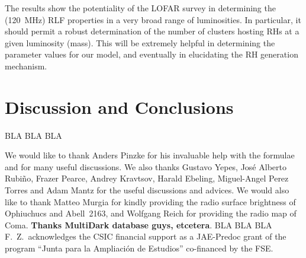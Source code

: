 \documentclass[traditabstract]{aa}
\begin{document}
The results show the potentiality of the LOFAR survey in determining the (120~MHz) RLF properties in a very broad range of luminosities. In particular, it should permit a robust determination of the number of clusters hosting RHs at a given luminosity (mass). This will be extremely helpful in determining the parameter values for our model, and eventually in elucidating the RH generation mechanism.


\section{Discussion and Conclusions}
\label{sec:6}
BLA BLA BLA\\


\begin{acknowledgements}
We would like to thank Anders Pinzke for his invaluable help with the formulae and for many useful discussions. We also thanks Gustavo Yepes, Jos\'e Alberto Rubi\~no, Frazer Pearce, Andrey Kravtsov, Harald Ebeling, Miguel-Angel Perez Torres and Adam Mantz for the useful discussions and advices. We would also like to thank Matteo Murgia for kindly providing the radio surface brightness of Ophiuchucs and Abell~2163, and Wolfgang Reich for providing the radio map of Coma. {\bf Thanks MultiDark database guys, etcetera}.
BLA BLA BLA\\ 
F.~Z.~acknowledges the CSIC financial support as a JAE-Predoc grant of the program ``Junta para la Ampliaci\'on de Estudios'' co-financed by the FSE.
\end{acknowledgements}
\end{document}
